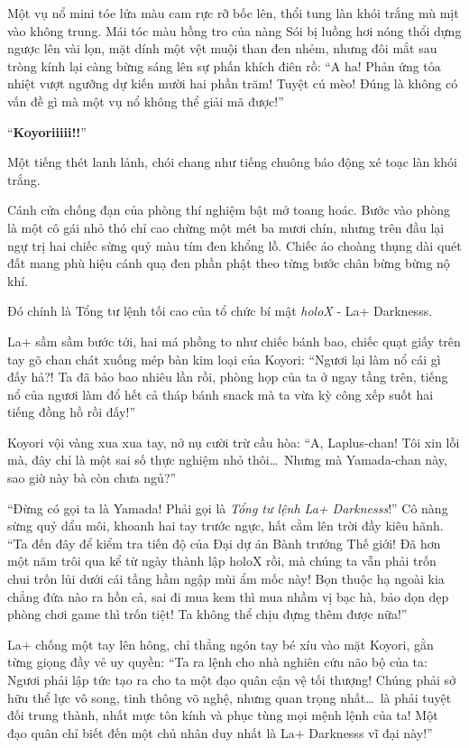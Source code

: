 \documentclass[../main.tex]{subfiles}
\begin{document}
Một vụ nổ mini tóe lửa màu cam rực rỡ bốc lên, thổi tung làn khói trắng mù mịt vào không trung. Mái tóc màu hồng tro của nàng Sói bị luồng hơi nóng thổi dựng ngược lên vài lọn, mặt dính một vệt muội than đen nhẻm, nhưng đôi mắt sau tròng kính lại càng bừng sáng lên sự phấn khích điên rồ: ``A ha! Phản ứng tỏa nhiệt vượt ngưỡng dự kiến mười hai phần trăm! Tuyệt cú mèo! Đúng là không có vấn đề gì mà một vụ nổ không thể giải mã được!''

``\textbf{Koyoriiiii!!}''

Một tiếng thét lanh lảnh, chói chang như tiếng chuông báo động xé toạc làn khói trắng.

Cánh cửa chống đạn của phòng thí nghiệm bật mở toang hoác. Bước vào phòng là một cô gái nhỏ thó chỉ cao chừng một mét ba mươi chín, nhưng trên đầu lại ngự trị hai chiếc sừng quỷ màu tím đen khổng lồ. Chiếc áo choàng thụng dài quét đất mang phù hiệu cánh quạ đen phần phật theo từng bước chân bừng bừng nộ khí.

Đó chính là Tổng tư lệnh tối cao của tổ chức bí mật \textit{holoX} - La+ Darknesss.

La+ sầm sầm bước tới, hai má phồng to như chiếc bánh bao, chiếc quạt giấy trên tay gõ chan chát xuống mép bàn kim loại của Koyori: ``Ngươi lại làm nổ cái gì đấy hả?! Ta đã bảo bao nhiêu lần rồi, phòng họp của ta ở ngay tầng trên, tiếng nổ của ngươi làm đổ hết cả tháp bánh snack mà ta vừa kỳ công xếp suốt hai tiếng đồng hồ rồi đấy!''

Koyori vội vàng xua xua tay, nở nụ cười trừ cầu hòa: ``A, Laplus-chan! Tôi xin lỗi mà, đây chỉ là một sai số thực nghiệm nhỏ thôi\dots\ Nhưng mà Yamada-chan này, sao giờ này bà còn chưa ngủ?''

``Đừng có gọi ta là Yamada! Phải gọi là \textit{Tổng tư lệnh La+ Darknesss}!'' Cô nàng sừng quỷ dẩu môi, khoanh hai tay trước ngực, hất cằm lên trời đầy kiêu hãnh. ``Ta đến đây để kiểm tra tiến độ của Đại dự án Bành trướng Thế giới! Đã hơn một năm trôi qua kể từ ngày thành lập holoX rồi, mà chúng ta vẫn phải trốn chui trốn lủi dưới cái tầng hầm ngập mùi ẩm mốc này! Bọn thuộc hạ ngoài kia chẳng đứa nào ra hồn cả, sai đi mua kem thì mua nhầm vị bạc hà, bảo dọn dẹp phòng chơi game thì trốn tiệt! Ta không thể chịu đựng thêm được nữa!''

La+ chống một tay lên hông, chỉ thẳng ngón tay bé xíu vào mặt Koyori, gằn từng giọng đầy vẻ uy quyền: ``Ta ra lệnh cho nhà nghiên cứu não bộ của ta: Ngươi phải lập tức tạo ra cho ta một đạo quân cận vệ tối thượng! Chúng phải sở hữu thể lực vô song, tinh thông võ nghệ, nhưng quan trọng nhất\dots\ là phải tuyệt đối trung thành, nhất mực tôn kính và phục tùng mọi mệnh lệnh của ta! Một đạo quân chỉ biết đến một chủ nhân duy nhất là La+ Darknesss vĩ đại này!''
\end{document}

